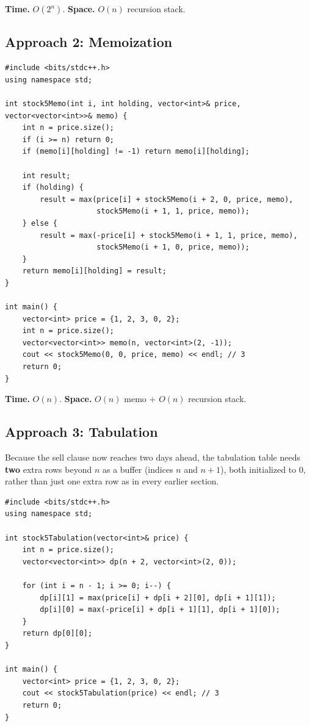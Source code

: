 \begin{complexitybox}
\textbf{Time.} $O(2^n)$.
\textbf{Space.} $O(n)$ recursion stack.
\end{complexitybox}

\subsection*{Approach 2: Memoization}

\begin{lstlisting}
#include <bits/stdc++.h>
using namespace std;

int stock5Memo(int i, int holding, vector<int>& price, vector<vector<int>>& memo) {
    int n = price.size();
    if (i >= n) return 0;
    if (memo[i][holding] != -1) return memo[i][holding];

    int result;
    if (holding) {
        result = max(price[i] + stock5Memo(i + 2, 0, price, memo),
                     stock5Memo(i + 1, 1, price, memo));
    } else {
        result = max(-price[i] + stock5Memo(i + 1, 1, price, memo),
                     stock5Memo(i + 1, 0, price, memo));
    }
    return memo[i][holding] = result;
}

int main() {
    vector<int> price = {1, 2, 3, 0, 2};
    int n = price.size();
    vector<vector<int>> memo(n, vector<int>(2, -1));
    cout << stock5Memo(0, 0, price, memo) << endl; // 3
    return 0;
}
\end{lstlisting}

\begin{complexitybox}
\textbf{Time.} $O(n)$.
\textbf{Space.} $O(n)$ memo $+$ $O(n)$ recursion stack.
\end{complexitybox}

\subsection*{Approach 3: Tabulation}

\begin{ideabox}
Because the sell clause now reaches two days ahead, the tabulation
table needs \textbf{two} extra rows beyond $n$ as a buffer (indices $n$
and $n+1$), both initialized to $0$, rather than just one extra row as
in every earlier section.
\end{ideabox}

\begin{lstlisting}
#include <bits/stdc++.h>
using namespace std;

int stock5Tabulation(vector<int>& price) {
    int n = price.size();
    vector<vector<int>> dp(n + 2, vector<int>(2, 0));

    for (int i = n - 1; i >= 0; i--) {
        dp[i][1] = max(price[i] + dp[i + 2][0], dp[i + 1][1]);
        dp[i][0] = max(-price[i] + dp[i + 1][1], dp[i + 1][0]);
    }
    return dp[0][0];
}

int main() {
    vector<int> price = {1, 2, 3, 0, 2};
    cout << stock5Tabulation(price) << endl; // 3
    return 0;
}
\end{lstlisting}

